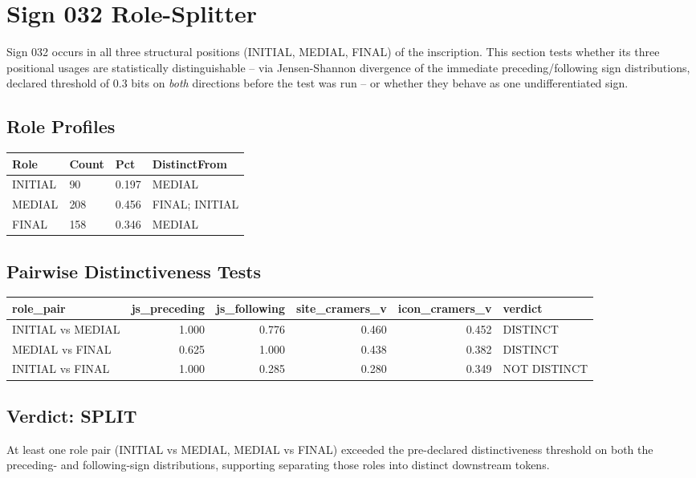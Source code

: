 \section{Sign 032 Role-Splitter}

Sign 032 occurs in all three structural positions (INITIAL, MEDIAL, FINAL) of
the inscription. This section tests whether its three positional usages are
statistically distinguishable -- via Jensen-Shannon divergence of the
immediate preceding/following sign distributions, declared threshold of
0.3 bits on \emph{both} directions before the test was run -- or whether they
behave as one undifferentiated sign.

\subsection{Role Profiles}
\begin{tabular}{llll}
\toprule
\textbf{Role} & \textbf{Count} & \textbf{Pct} & \textbf{DistinctFrom} \\
\midrule
INITIAL & 90 & 0.197 & MEDIAL \\
MEDIAL & 208 & 0.456 & FINAL; INITIAL \\
FINAL & 158 & 0.346 & MEDIAL \\
\bottomrule
\end{tabular}

\subsection{Pairwise Distinctiveness Tests}
\begin{tabular}{lrrrrl}
\toprule
\textbf{role\_pair} & \textbf{js\_preceding} & \textbf{js\_following} & \textbf{site\_cramers\_v} & \textbf{icon\_cramers\_v} & \textbf{verdict} \\
\midrule
INITIAL vs MEDIAL & 1.000 & 0.776 & 0.460 & 0.452 & DISTINCT \\
MEDIAL vs FINAL & 0.625 & 1.000 & 0.438 & 0.382 & DISTINCT \\
INITIAL vs FINAL & 1.000 & 0.285 & 0.280 & 0.349 & NOT DISTINCT \\
\bottomrule
\end{tabular}

\subsection*{Verdict: SPLIT}
At least one role pair (INITIAL vs MEDIAL, MEDIAL vs FINAL) exceeded the pre-declared distinctiveness threshold on both the preceding- and following-sign distributions, supporting separating those roles into distinct downstream tokens.

